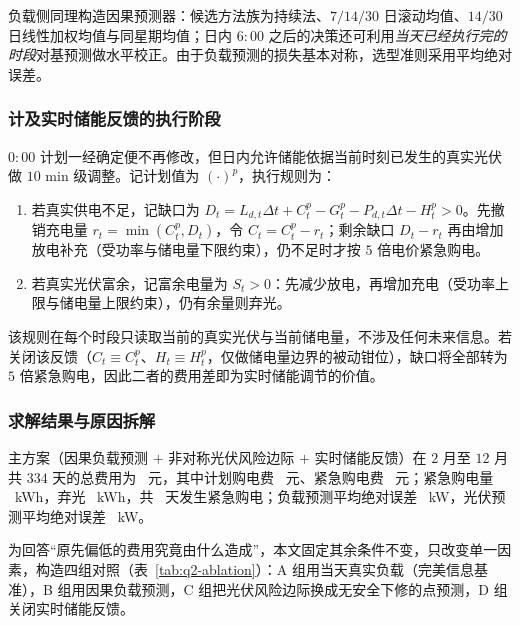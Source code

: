 负载侧同理构造因果预测器：候选方法族为持续法、$7/14/30$ 日滚动均值、$14/30$ 日线性加权均值与同星期均值；日内 $6{:}00$ 之后的决策还可利用\emph{当天已经执行完的时段}对基预测做水平校正。由于负载预测的损失基本对称，选型准则采用平均绝对误差。

\subsubsection{计及实时储能反馈的执行阶段}

$0{:}00$ 计划一经确定便不再修改，但日内允许储能依据当前时刻已发生的真实光伏做 $10$ min 级调整。记计划值为 $(\cdot)^{p}$，执行规则为：

\begin{enumerate}[label=(\arabic*), itemsep=2pt, topsep=2pt]
	\item 若真实供电不足，记缺口为 $D_t=L_{d,t}\Delta t+C^p_t-G^p_t-P_{d,t}\Delta t-H^p_t>0$。先撤销充电量 $r_t=\min(C^p_t,D_t)$，令 $C_t=C^p_t-r_t$；剩余缺口 $D_t-r_t$ 再由增加放电补充（受功率与储电量下限约束），仍不足时才按 $5$ 倍电价紧急购电。
	\item 若真实光伏富余，记富余电量为 $S_{t}>0$：先减少放电，再增加充电（受功率上限与储电量上限约束），仍有余量则弃光。
\end{enumerate}

该规则在每个时段只读取当前的真实光伏与当前储电量，不涉及任何未来信息。若关闭该反馈（$C_{t}\equiv C^{p}_{t}$、$H_{t}\equiv H^{p}_{t}$，仅做储电量边界的被动钳位），缺口将全部转为 $5$ 倍紧急购电，因此二者的费用差即为实时储能调节的价值。

\subsubsection{求解结果与原因拆解}

主方案（因果负载预测 $+$ 非对称光伏风险边际 $+$ 实时储能反馈）在 $2$ 月至 $12$ 月共 $334$ 天的总费用为 \QtwoTotal\ 元，其中计划购电费 \QtwoPlan\ 元、紧急购电费 \QtwoEmergencyCost\ 元；紧急购电量 \QtwoEmergency\ kWh，弃光 \QtwoCurtail\ kWh，共 \QtwoDays\ 天发生紧急购电；负载预测平均绝对误差 \QtwoMae\ kW，光伏预测平均绝对误差 \QtwoPvMae\ kW。

为回答“原先偏低的费用究竟由什么造成”，本文固定其余条件不变，只改变单一因素，构造四组对照（表~\ref{tab:q2-ablation}）：A 组用当天真实负载（完美信息基准），B 组用因果负载预测，C 组把光伏风险边际换成无安全下修的点预测，D 组关闭实时储能反馈。

